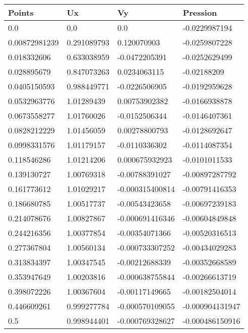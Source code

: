 \begin{tabular}{llll}
	Points & Ux & Vy & Pression \\ 
\midrule 
	0.0 & 0.0 & 0.0 & -0.0229987194 \\ 
	0.00872981239 & 0.291089793 & 0.120070903 & -0.0259807228 \\ 
	0.018332606 & 0.633038959 & -0.0472205391 & -0.0252629499 \\ 
	0.028895679 & 0.847073263 & 0.0234063115 & -0.02188209 \\ 
	0.0405150593 & 0.988449771 & -0.0226506905 & -0.0192959628 \\ 
	0.0532963776 & 1.01289439 & 0.00753902382 & -0.0166938878 \\ 
	0.0673558277 & 1.01760026 & -0.0152506344 & -0.0146407361 \\ 
	0.0828212229 & 1.01456059 & 0.00278800793 & -0.0128692647 \\ 
	0.0998331576 & 1.01179157 & -0.0110336302 & -0.0114087354 \\ 
	0.118546286 & 1.01214206 & 0.000675932923 & -0.0101011533 \\ 
	0.139130727 & 1.00769318 & -0.00788391027 & -0.00897287792 \\ 
	0.161773612 & 1.01029217 & -0.000315400814 & -0.00791416353 \\ 
	0.186680785 & 1.00517737 & -0.00543423658 & -0.00697239183 \\ 
	0.214078676 & 1.00827867 & -0.000691416346 & -0.00604849848 \\ 
	0.244216356 & 1.00377854 & -0.00354071366 & -0.00520316513 \\ 
	0.277367804 & 1.00560134 & -0.000733307252 & -0.00434029283 \\ 
	0.313834397 & 1.00347545 & -0.00212688339 & -0.00352668589 \\ 
	0.353947649 & 1.00203816 & -0.000638755844 & -0.00266613719 \\ 
	0.398072226 & 1.00367604 & -0.00117149665 & -0.00182504014 \\ 
	0.446609261 & 0.999277784 & -0.000570109055 & -0.000904131947 \\ 
	0.5 & 0.998944401 & -0.000769328627 & -0.000486150916 \\ 
\end{tabular}